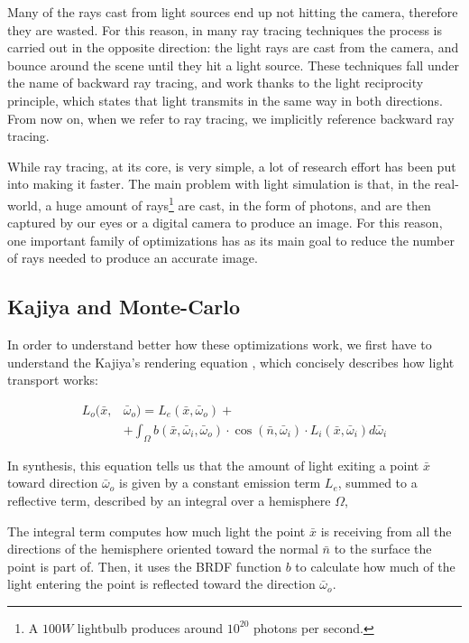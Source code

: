 \documentclass[11pt,a4paper,twocolumn]{article}
\begin{document}
Many of the rays cast from light sources end up not hitting the camera, therefore they are wasted. For this reason, in many ray tracing techniques the process is carried out in the opposite direction: the light rays are cast from the camera, and bounce around the scene until they hit a light source. These techniques fall under the name of backward ray tracing, and work thanks to the light reciprocity principle, which states that light transmits in the same way in both directions. From now on, when we refer to ray tracing, we implicitly reference backward ray tracing.

While ray tracing, at its core, is very simple, a lot of research effort has been put into making it faster. The main problem with light simulation is that, in the real-world, a huge amount of rays\footnote{A $100W$ lightbulb produces around $10^{20}$ photons per second.} are cast, in the form of photons, and are then captured by our eyes or a digital camera to produce an image. For this reason, one important family of optimizations has as its main goal to reduce the number of rays needed to produce an accurate image.

\subsection{Kajiya and Monte-Carlo}
In order to understand better how these optimizations work, we first have to understand the Kajiya's rendering equation \cite{rendering_equation}, which concisely describes how light transport works:

\begin{subequations}
    \begin{align*}
        L_o(\bar{x},&\bar{\omega}_o) = L_e(\bar{x}, \bar{\omega}_o) +\\
        &+\int_\Omega b(\bar{x}, \bar{\omega}_i, \bar{\omega}_o) \cdot \cos(\bar{n}, \bar{\omega}_i) \cdot L_i(\bar{x}, \bar{\omega}_i) d\bar{\omega}_i
    \end{align*}
\end{subequations}

In synthesis, this equation tells us that the amount of light exiting a point $\bar{x}$ toward direction $\bar{\omega}_o$ is given by a constant emission term $L_e$, summed to a reflective term, described by an integral over a hemisphere $\Omega$,

The integral term computes how much light the point $\bar{x}$ is receiving from all the directions of the hemisphere oriented toward the normal $\bar{n}$ to the surface the point is part of. Then, it uses the BRDF function $b$ to calculate how much of the light entering the point is reflected toward the direction $\bar{\omega}_o$.
\end{document}
